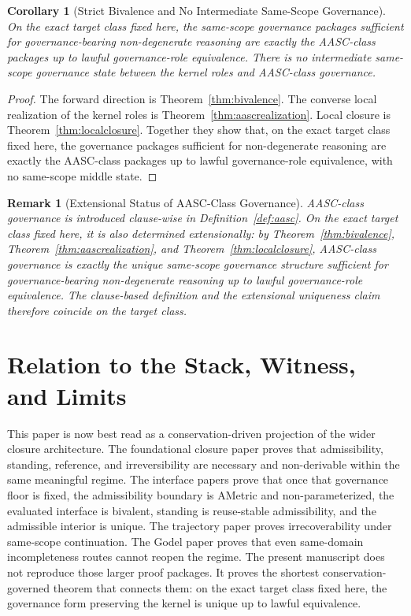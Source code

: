 \documentclass[11pt]{article}
\newtheorem{corollary}[theorem]{Corollary}
\newtheorem{remark}[theorem]{Remark}
\begin{document}
\begin{corollary}[Strict Bivalence and No Intermediate Same-Scope Governance]
\label{cor:strictbiv}
On the exact target class fixed here, the same-scope governance packages sufficient for governance-bearing non-degenerate reasoning are exactly the AASC-class packages up to lawful governance-role equivalence. There is no intermediate same-scope governance state between the kernel roles and AASC-class governance.
\end{corollary}

\begin{proof}
The forward direction is Theorem~\ref{thm:bivalence}. The converse local realization of the kernel roles is Theorem~\ref{thm:aascrealization}. Local closure is Theorem~\ref{thm:localclosure}. Together they show that, on the exact target class fixed here, the governance packages sufficient for non-degenerate reasoning are exactly the AASC-class packages up to lawful governance-role equivalence, with no same-scope middle state.
\end{proof}

\begin{remark}[Extensional Status of AASC-Class Governance]
\label{rem:aascextensional}
AASC-class governance is introduced clause-wise in Definition~\ref{def:aasc}. On the exact target class fixed here, it is also determined extensionally: by Theorem~\ref{thm:bivalence}, Theorem~\ref{thm:aascrealization}, and Theorem~\ref{thm:localclosure}, AASC-class governance is exactly the unique same-scope governance structure sufficient for governance-bearing non-degenerate reasoning up to lawful governance-role equivalence. The clause-based definition and the extensional uniqueness claim therefore coincide on the target class.
\end{remark}

\section{Relation to the Stack, Witness, and Limits}

This paper is now best read as a conservation-driven projection of the wider closure architecture. The foundational closure paper proves that admissibility, standing, reference, and irreversibility are necessary and non-derivable within the same meaningful regime. The interface papers prove that once that governance floor is fixed, the admissibility boundary is AMetric and non-parameterized, the evaluated interface is bivalent, standing is reuse-stable admissibility, and the admissible interior is unique. The trajectory paper proves irrecoverability under same-scope continuation. The Godel paper proves that even same-domain incompleteness routes cannot reopen the regime. The present manuscript does not reproduce those larger proof packages. It proves the shortest conservation-governed theorem that connects them: on the exact target class fixed here, the governance form preserving the kernel is unique up to lawful equivalence.
\end{document}
